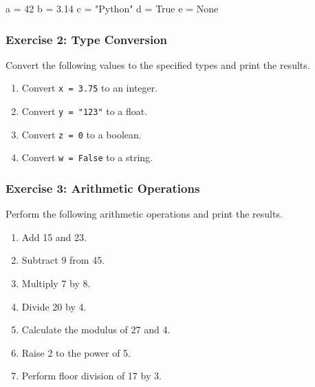 \documentclass[
  letterpaper,
  DIV=11,
  numbers=noendperiod]{scrreprt}
\newenvironment{Shaded}{\begin{snugshade}}{\end{snugshade}}
\newcommand{\DecValTok}[1]{\textcolor[rgb]{0.68,0.00,0.00}{#1}}
\newcommand{\FloatTok}[1]{\textcolor[rgb]{0.68,0.00,0.00}{#1}}
\newcommand{\NormalTok}[1]{\textcolor[rgb]{0.00,0.23,0.31}{#1}}
\newcommand{\OperatorTok}[1]{\textcolor[rgb]{0.37,0.37,0.37}{#1}}
\newcommand{\StringTok}[1]{\textcolor[rgb]{0.13,0.47,0.30}{#1}}
\newcommand{\VariableTok}[1]{\textcolor[rgb]{0.07,0.07,0.07}{#1}}
\providecommand{\tightlist}{%
  \setlength{\itemsep}{0pt}\setlength{\parskip}{0pt}}\usepackage{longtable,booktabs,array}
\begin{document}
\begin{Shaded}
\begin{Highlighting}[]
\NormalTok{a }\OperatorTok{=} \DecValTok{42}
\NormalTok{b }\OperatorTok{=} \FloatTok{3.14}
\NormalTok{c }\OperatorTok{=} \StringTok{"Python"}
\NormalTok{d }\OperatorTok{=} \VariableTok{True}
\NormalTok{e }\OperatorTok{=} \VariableTok{None}
\end{Highlighting}
\end{Shaded}

\hypertarget{exercise-2-type-conversion}{%
\subsubsection{Exercise 2: Type
Conversion}\label{exercise-2-type-conversion}}

Convert the following values to the specified types and print the
results.

\begin{enumerate}
\def\labelenumi{\alph{enumi}.}
\tightlist
\item
  Convert \texttt{x\ =\ 3.75} to an integer.
\item
  Convert \texttt{y\ =\ "123"} to a float.
\item
  Convert \texttt{z\ =\ 0} to a boolean.
\item
  Convert \texttt{w\ =\ False} to a string.
\end{enumerate}

\hypertarget{exercise-3-arithmetic-operations}{%
\subsubsection{Exercise 3: Arithmetic
Operations}\label{exercise-3-arithmetic-operations}}

Perform the following arithmetic operations and print the results.

\begin{enumerate}
\def\labelenumi{\alph{enumi}.}
\tightlist
\item
  Add 15 and 23.
\item
  Subtract 9 from 45.
\item
  Multiply 7 by 8.
\item
  Divide 20 by 4.
\item
  Calculate the modulus of 27 and 4.
\item
  Raise 2 to the power of 5.
\item
  Perform floor division of 17 by 3.
\end{enumerate}
\end{document}

